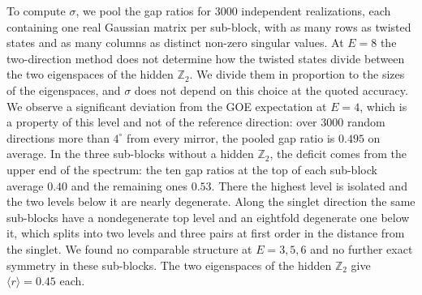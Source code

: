 \documentclass[aps,twocolumn,preprintnumbers,groupedaddress,nofootinbib,prl]{revtex4-2}
\makeatletter
\newcommand{\SMfilename}{chaotic-kummer-SM}
\def\arXivversion{}
\newcommand{\rmean}{\langle r\rangle}
\def\SMsetup{\let\@hangfrom@section\SM@hangfrom \let\@sectioncntformat\SM@cntformat
    \@removefromreset{equation}{section}}
\makeatother
\begin{document}
To compute $\sigma$, we pool the gap ratios for $3000$ independent realizations, each containing one real Gaussian matrix per sub-block, with as many rows as twisted states and as many columns as distinct non-zero singular values. At $E=8$ the two-direction method does not determine how the twisted states divide between the two eigenspaces of the hidden $\mathbb Z_2$. We divide them in proportion to the sizes of the eigenspaces, and $\sigma$ does not depend on this choice at the quoted accuracy. We observe a significant deviation from the GOE expectation at $E=4$, which is a property of this level and not of the reference direction: over $3000$ random directions more than $4^\circ$ from every mirror, the pooled gap ratio is $0.495$ on average. In the three sub-blocks without a hidden $\mathbb Z_2$, the deficit comes from the upper end of the spectrum: the ten gap ratios at the top of each sub-block average $0.40$ and the remaining ones $0.53$. There the highest level is isolated and the two levels below it are nearly degenerate. Along the singlet direction the same sub-blocks have a nondegenerate top level and an eightfold degenerate one below it, which splits into two levels and three pairs at first order in the distance from the singlet. We found no comparable structure at $E=3,5,6$ and no further exact symmetry in these sub-blocks. The two eigenspaces of the hidden $\mathbb Z_2$ give $\rmean=0.45$ each.


\ifdefined\arXivversion
  \clearpage
  \onecolumngrid
  \SMsetup
  
\fi
\end{document}
